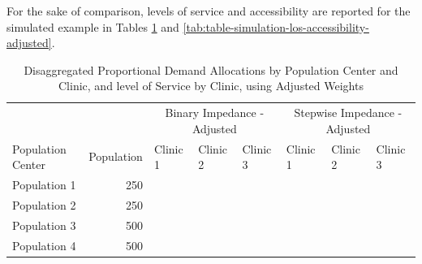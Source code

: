 \documentclass[10pt,letterpaper]{article}
\begin{document}
For the sake of comparison, levels of service and accessibility are
reported for the simulated example in Tables
\ref{tab:table-simulation-demand-adjusted} and
\ref{tab:table-simulation-los-accessibility-adjusted}.

\begin{landscape}\begin{table}[t]

\caption{\label{tab:table-simulation-demand-adjusted}\label{tab:table-simulation-demand-adjusted}Disaggregated Proportional Demand Allocations by Population Center and Clinic, and level of Service by Clinic, using Adjusted Weights}
\centering
\fontsize{7}{9}\selectfont
\begin{tabular}{lrllllll}
\toprule
\multicolumn{2}{c}{ } & \multicolumn{3}{c}{Binary Impedance - Adjusted} & \multicolumn{3}{c}{Stepwise Impedance - Adjusted} \\
\cmidrule(l{3pt}r{3pt}){3-5} \cmidrule(l{3pt}r{3pt}){6-8}
Population Center & Population & Clinic 1 & Clinic 2 & Clinic 3 & Clinic 1 & Clinic 2 & Clinic 3\\
\midrule
Population 1 & 250 & \cellcolor[HTML]{0D0887}{\textcolor{black}{250}} & \cellcolor[HTML]{FCA636}{\textcolor{black}{0}} & \cellcolor[HTML]{FCA636}{\textcolor{black}{0}} & \cellcolor[HTML]{0D0887}{\textcolor{black}{250}} & \cellcolor[HTML]{FCA636}{\textcolor{black}{0}} & \cellcolor[HTML]{FCA636}{\textcolor{black}{0}}\\
Population 2 & 250 & \cellcolor[HTML]{7A02A8}{\textcolor{black}{125}} & \cellcolor[HTML]{7A02A8}{\textcolor{black}{125}} & \cellcolor[HTML]{FCA636}{\textcolor{black}{0}} & \cellcolor[HTML]{0D0887}{\textcolor{black}{178.15}} & \cellcolor[HTML]{C6417D}{\textcolor{black}{71.853}} & \cellcolor[HTML]{FCA636}{\textcolor{black}{0}}\\
Population 3 & 500 & \cellcolor[HTML]{D35171}{\textcolor{black}{166.67}} & \cellcolor[HTML]{D35171}{\textcolor{black}{166.67}} & \cellcolor[HTML]{D35171}{\textcolor{black}{166.67}} & \cellcolor[HTML]{FCA636}{\textcolor{black}{111.62}} & \cellcolor[HTML]{0D0887}{\textcolor{black}{276.75}} & \cellcolor[HTML]{FCA636}{\textcolor{black}{111.62}}\\
Population 4 & 500 & \cellcolor[HTML]{8405A7}{\textcolor{black}{166.67}} & \cellcolor[HTML]{8405A7}{\textcolor{black}{166.67}} & \cellcolor[HTML]{8405A7}{\textcolor{black}{166.67}} & \cellcolor[HTML]{0D0887}{\textcolor{black}{208.04}} & \cellcolor[HTML]{0D0887}{\textcolor{black}{208.04}} & \cellcolor[HTML]{FCA636}{\textcolor{black}{83.911}}\\

\end{tabular}
\end{table}
\end{landscape}
\end{document}

